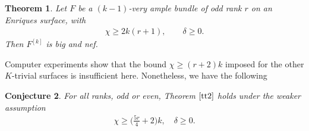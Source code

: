 \documentclass[pdftex]{sigma}
\numberwithin{equation}{section}
\newtheorem{Theorem}{Theorem}[section]
\newtheorem{Conjecture}[Theorem]{Conjecture}
\begin{document}
\begin{Theorem}\label{tt2}
Let $F$ be a $(k-1)$-very ample bundle of odd rank $r$ on an Enriques surface, with
\begin{gather*}
\chi\geq 2k (r+1), \qquad \delta\geq 0.
\end{gather*}
Then $F^{[k]}$ is big and nef.
\end{Theorem}
Computer experiments show that the bound $\chi\geq (r+2)k$ imposed for the other $K$-trivial surfaces is insufficient here. Nonetheless, we have the following

\begin{Conjecture}
For all ranks, odd or even, Theorem $\ref{tt2}$ holds under the weaker assumption
\begin{gather*}
\chi\geq \biggl(\frac{5r}{4}+2\biggr)k,\quad \delta\geq 0.
\end{gather*}
\end{Conjecture}
\end{document}
